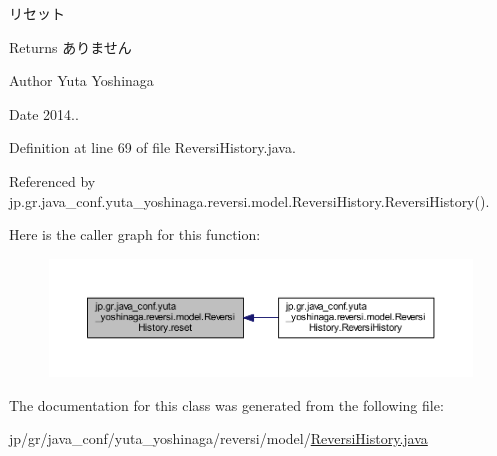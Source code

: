 リセット 

\begin{DoxyReturn}{Returns}
ありません 
\end{DoxyReturn}
\begin{DoxyAuthor}{Author}
Yuta Yoshinaga 
\end{DoxyAuthor}
\begin{DoxyDate}{Date}
2014.. 
\end{DoxyDate}


Definition at line 69 of file Reversi\+History.\+java.



Referenced by jp.\+gr.\+java\+\_\+conf.\+yuta\+\_\+yoshinaga.\+reversi.\+model.\+Reversi\+History.\+Reversi\+History().

Here is the caller graph for this function\+:
\nopagebreak
\begin{figure}[H]
\begin{center}
\leavevmode
\includegraphics[width=350pt]{classjp_1_1gr_1_1java__conf_1_1yuta__yoshinaga_1_1reversi_1_1model_1_1_reversi_history_aee0155159a017671c2b18c1d8229d8d1_icgraph}
\end{center}
\end{figure}


The documentation for this class was generated from the following file\+:\begin{DoxyCompactItemize}
\item 
jp/gr/java\+\_\+conf/yuta\+\_\+yoshinaga/reversi/model/\mbox{\hyperlink{_reversi_history_8java}{Reversi\+History.\+java}}\end{DoxyCompactItemize}
